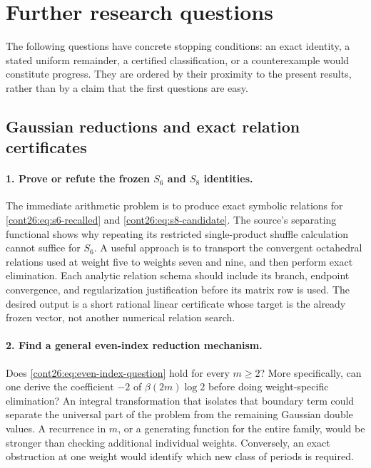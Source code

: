 \section{Further research questions}
\label{cont26:sec:further}

The following questions have concrete stopping conditions: an exact
identity, a stated uniform remainder, a certified classification, or
a counterexample would constitute progress. They are ordered by
their proximity to the present results, rather than by a claim that
the first questions are easy.

\subsection{Gaussian reductions and exact relation certificates}

\paragraph{1. Prove or refute the frozen $S_6$ and $S_8$ identities.}
The immediate arithmetic problem is to produce exact symbolic
relations for \eqref{cont26:eq:s6-recalled} and \eqref{cont26:eq:s8-candidate}.
The source's separating functional shows why repeating its
restricted single-product shuffle calculation cannot suffice for
$S_6$. A useful approach is to transport the convergent octahedral
relations used at weight five to weights seven and nine, and then
perform exact elimination. Each analytic relation schema should
include its branch, endpoint convergence, and regularization
justification before its matrix row is used. The desired output is a
short rational linear certificate whose target is the already frozen
vector, not another numerical relation search.

\paragraph{2. Find a general even-index reduction mechanism.}
Does \eqref{cont26:eq:even-index-question} hold for every $m\ge2$?
More specifically, can one derive the coefficient $-2$ of
$\beta(2m)\log2$ before doing weight-specific elimination?
An integral transformation that isolates that boundary term could
separate the universal part of the problem from the remaining
Gaussian double values. A recurrence in $m$, or a generating
function for the entire family, would be stronger than checking
additional individual weights. Conversely, an exact obstruction at
one weight would identify which new class of periods is required.

